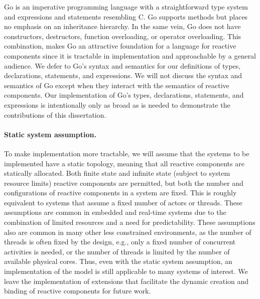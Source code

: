 Go is an imperative programming language with a straightforward type system and expressions and statements resembling C.
Go supports methods but places no emphasis on an inheritance hierarchy.
In the same vein, Go does not have constructors, destructors, function overloading, or operator overloading.
This combination, makes Go an attractive foundation for a language for reactive components since it is tractable in implementation and approachable by a general audience.
We defer to Go's syntax and semantics for our definitions of types, declarations, statements, and expressions.
We will not discuss the syntax and semantics of Go except when they interact with the semantics of reactive components.
Our implementation of Go's types, declarations, statements, and expressions is intentionally only as broad as is needed to demonstrate the contributions of this dissertation.

\paragraph{Static system assumption.}
To make implementation more tractable, we will assume that the systems to be implemented have a static topology, meaning that all reactive components are statically allocated.
Both finite state and infinite state (subject to system resource limits) reactive components are permitted, but both the number and configurations of reactive components in a system are fixed.
This is roughly equivalent to systems that assume a fixed number of actors or threads.
These assumptions are common in embedded and real-time systems due to the combination of limited resources and a need for predictability.
These assumptions also are common in many other less constrained environments, as the number of threads is often fixed by the design, e.g., only a fixed number of concurrent activities is needed, or the number of threads is limited by the number of available physical cores.
Thus, even with the static system assumption, an implementation of the model is still applicable to many systems of interest.
We leave the implementation of extensions that facilitate the dynamic creation and binding of reactive components for future work.

